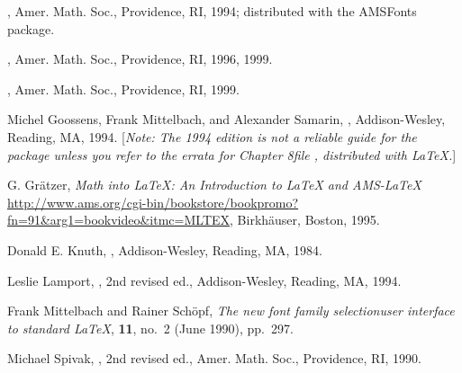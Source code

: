 \begin{thebibliography}{9}

,
Amer. Math. Soc., Providence, RI, 1994; distributed
with the AMSFonts package.

,
Amer. Math. Soc., Providence, RI, 1996, 1999.

,
Amer. Math. Soc., Providence, RI, 1999.

 Michel Goossens, Frank Mittelbach, and Alexander Samarin,
, Addison-Wesley, Reading, MA, 1994.
  [\emph{Note: The 1994 edition is not a reliable guide for the
     package unless you refer to the errata for Chapter
    8\mdash file , distributed with \LaTeX{}.}]

\begin{raggedright}
 G. Gr\"{a}tzer,
\emph{Math into \LaTeX{}: An Introduction to \LaTeX{} and AMS-\LaTeX{}}
  \url{http://www.ams.org/cgi-bin/bookstore/bookpromo?fn=91&arg1=bookvideo&itmc=MLTEX},
Birkh\"{a}user, Boston, 1995.\par
\end{raggedright}

 Donald E. Knuth, ,
Addison-Wesley, Reading, MA, 1984.

 Leslie Lamport, , 2nd revised ed., Addison-Wesley, Reading, MA, 1994.

 Frank Mittelbach and Rainer Sch\"opf,
\textit{The new font family selection\mdash user
interface to standard \LaTeX{}},  \textbf{11},
no.~2 (June 1990), pp.~297.

 Michael Spivak, , 2nd revised ed.,
Amer. Math. Soc., Providence, RI, 1990.

\end{thebibliography}




